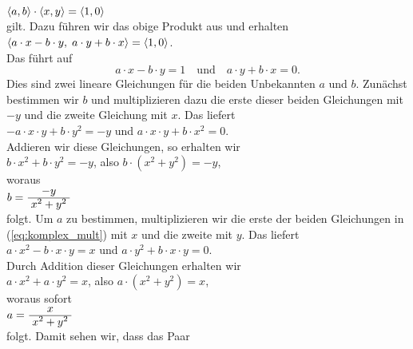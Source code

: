 \hspace*{1.3cm} $\pair(a,b) \cdot \pair(x,y) = \pair(1,0)$
\\[0.2cm]
gilt.  Dazu führen wir das obige Produkt aus und erhalten
\\[0.2cm]
\hspace*{1.3cm} $\pair(a \cdot x - b \cdot y,\; a \cdot y + b \cdot x) = \pair(1,0)$.
\\[0.2cm]
Das führt auf 
\begin{equation}
  \label{eq:komplex_mult}  
 a \cdot x - b \cdot y = 1 \quad \mbox{und} \quad a \cdot y + b \cdot x = 0.
\end{equation}
Dies sind zwei lineare Gleichungen für die beiden Unbekannten $a$ und $b$.  Zunächst bestimmen wir
$b$ und multiplizieren dazu die erste dieser beiden Gleichungen mit $-y$ und die zweite Gleichung mit $x$.  Das
liefert
\\[0.2cm]
\hspace*{1.3cm} 
$-a \cdot x \cdot y + b \cdot y^2 = -y$ \quad und \quad $a \cdot x \cdot y + b \cdot
x^2 = 0$.
\\[0.2cm]
Addieren wir diese Gleichungen, so erhalten wir
\\[0.2cm]
\hspace*{1.3cm} 
$b \cdot x^2 + b \cdot y^2 = -y$, \quad also \quad
$b \cdot (x^2 + y^2) = -y$,
\\[0.2cm]
woraus
\\[0.2cm]
\hspace*{1.3cm} $b = \bruch{-y}{x^2 + y^2}$
\\[0.2cm]
folgt.  Um $a$ zu bestimmen, multiplizieren wir die erste der beiden Gleichungen in
(\ref{eq:komplex_mult}) mit $x$ und die zweite mit $y$.  Das liefert
\\[0.2cm]
\hspace*{1.3cm}
$a \cdot x^2 - b \cdot x \cdot y = x$ \quad und \quad $a \cdot y^2 + b \cdot x \cdot y = 0$.
\\[0.2cm]
Durch Addition dieser Gleichungen erhalten wir
\\[0.2cm]
\hspace*{1.3cm}
$a \cdot x^2 + a \cdot y^2 = x$, \quad also \quad $a \cdot (x^2 + y^2) = x$,
\\[0.2cm]
woraus sofort
\\[0.2cm]
\hspace*{1.3cm}
$a = \bruch{x}{x^2 + y^2}$
\\[0.2cm]
folgt.  Damit sehen wir, dass das Paar
\\[0.2cm]
\hspace*{1.3cm}
